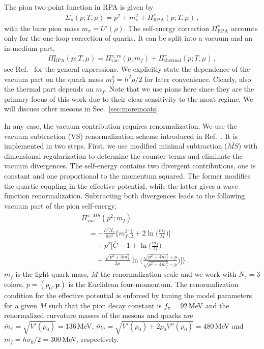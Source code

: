 \documentclass[reprint,english,superscriptaddress,preprintnumbers,amsmath,amssymb,aps,prd]{revtex4-2}
\def\Sec#1{Sec.~\ref{#1}}
\begin{document}
The pion two-point function in RPA is given by
%
\begin{align}\label{eq:two-point}
\Sigma_\pi(p;T,\mu)=p^2+m^2_\pi+\Pi^{\pi}_\mathrm{RPA}(p;T,\mu)\,,
\end{align}
%
with the bare pion mass $m_\pi = U'(\rho)$. The self-energy correction $\Pi^{\pi}_\mathrm{RPA}$ accounts only for the one-loop correction of quarks. It can be split into a vacuum and an in-medium part,
%
\begin{align}\label{eq:Pifull}
\Pi^\pi_{\mathrm{RPA}}(p;T,\mu)=\Pi^{\pi,\mathrm{vs}}_{\mathrm{vac}}(p,m_f)+\Pi^{\pi}_\mathrm{thermal}(p;T,\mu)\,,
\end{align}
%
see Ref.\ \cite{Rennecke:2025kub} for the general expressions. We explicitly state the dependence of the vacuum part on the quark mass $m_f^2 = h^2 \rho/2$ for later convenience. Clearly, also the thermal part depends on $m_f$. Note that we use pions here since they are the primary focus of this work due to their clear sensitivity to the moat regime. We will discuss other mesons in \Sec{sec:moremoats}.

In any case, the vacuum contribution requires renormalization. We use the vacuum subtraction (VS) renormalization scheme introduced in Ref.\ \cite{Rennecke:2025kub}. It is implemented in two steps. First, we use modified minimal subtraction ($\overline{MS}$) with dimensional regularization to determine the counter terms and eliminate the vacuum divergences. The self-energy contains two divergent contributions, one is constant and one proportional to the momentum squared. The former modifies the quartic coupling in the effective potential, while the latter gives a wave function renormalization. Subtracting both divergences leads to the following vacuum part of the pion self-energy,
%
\begin{align}\label{eq:two_point_re}
&\Pi_\mathrm{vac}^{\pi,\overline{MS}}(p^2;m_f)\nonumber\\[1ex]
&\quad=-\frac{h^2N_c}{8\pi^2}\Bigg\{m_f^2\bigg[\frac{1}{2}+2\ln\!\Big(\frac{m_f}{M}\Big)\bigg]\nonumber\\[1ex]
&\qquad+p^2\Bigg[\bar C -1 + \ln\!\Big(\frac{m_f}{M}\Big)\nonumber\\[1ex]
&\qquad+\frac{\sqrt{p^2+4m_f^2}}{2p}\ln\!\Bigg(\frac{\sqrt{p^2+4m_f^2}+p}{\sqrt{p^2+4m_f^2}-p}\Bigg)\Bigg]\Bigg\}\,.
\end{align}
%
$m_f$ is the light quark mass, $M$ the renormalization scale and we work with $N_c=3$ colors. $p=(p_0,\mathbf{p})$ is the Euclidean four-momentum. The renormalization condition for the effective potential is enforced by tuning the model parameters for a given $M$ such that the pion decay constant is $f_\pi = 92$\,MeV and the renormalized curvature masses of the mesons and quarks are $\bar m_\pi = \sqrt{V'(\rho_0)} = 136$\,MeV, $\bar m_\sigma = \sqrt{V'(\rho_0) + 2 \rho_0 V''(\rho_0)} = 480$\,MeV and $m_f = h\sigma_0/2= 300$\,MeV, respectively.
\end{document}
